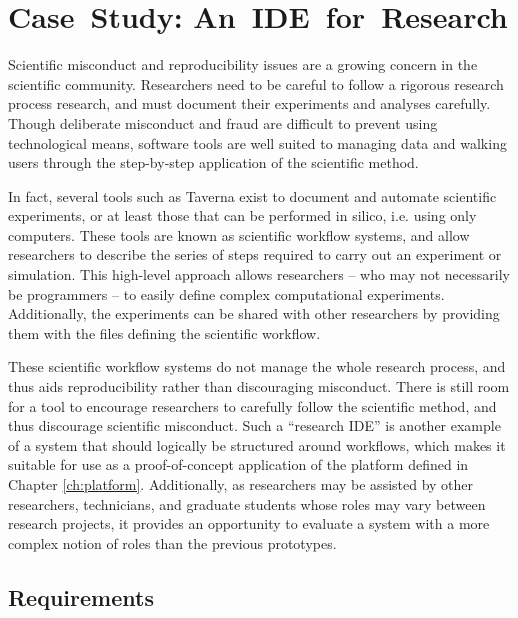 \documentclass[document.tex]{subfiles}
\begin{document}
\chapter{Case~Study: An~IDE~for~Research}
\label {ch:case-study-2}

Scientific misconduct and reproducibility issues are a growing concern in the scientific community. Researchers need to be careful to follow a rigorous research process research, and must document their experiments and analyses carefully. Though deliberate misconduct and fraud are difficult to prevent using technological means, software tools are well suited to managing data and walking users through the step-by-step application of the scientific method.

In fact, several tools such as Taverna \cite{taverna-website} exist to document and automate scientific experiments, or at least those that can be performed in silico, i.e. using only computers. These tools are known as scientific workflow systems, and allow researchers to describe the series of steps required to carry out an experiment or simulation. This high-level approach allows researchers -- who may not necessarily be programmers -- to easily define complex computational experiments. Additionally, the experiments can be shared with other researchers by providing them with the files defining the scientific workflow.

These scientific workflow systems do not manage the whole research process, and thus aids reproducibility rather than discouraging misconduct. There is still room for a tool to encourage researchers to carefully follow the scientific method, and thus discourage scientific misconduct. Such a ``research IDE'' is another example of a system that should logically be structured around workflows, which makes it suitable for use as a proof-of-concept application of the platform defined in Chapter \ref{ch:platform}. Additionally, as researchers may be assisted by other researchers, technicians, and graduate students whose roles may vary between research projects, it provides an opportunity to evaluate a system with a more complex notion of roles than the previous prototypes.

\section {Requirements}
\label{sec:case-research-requirements}
\end{document}
